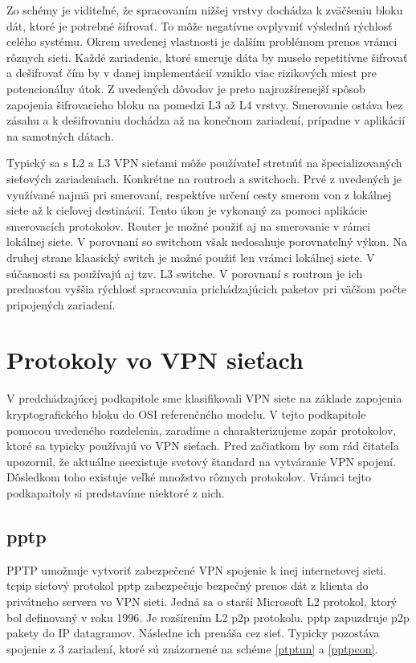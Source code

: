 Zo schémy je viditeľné, že spracovaním nižšej vrstvy dochádza k zväčšeniu bloku dát, ktoré je potrebné šifrovať. To môže negatívne ovplyvniť výslednú rýchlosť celého systému. Okrem uvedenej vlastnosti je dalším problémom prenos vrámci rôznych sieti. Každé zariadenie, ktoré smeruje dáta by muselo repetitívne šifrovať a dešifrovať čím by v danej implementácií vzniklo viac rizikových miest pre potencionálny útok. Z uvedených dôvodov je preto najrozšírenejší spôsob zapojenia šifrovacieho bloku na pomedzi L3 až L4 vrstvy. Smerovanie ostáva bez zásahu a k dešifrovaniu dochádza až na konečnom zariadení, prípadne v aplikácií na samotných dátach.

Typický sa s L2 a L3 VPN sieťami môže používateľ stretnúť na špecializovaných sieťových zariadeniach. Konkrétne na routroch a switchoch. Prvé z uvedených je využívané najmä pri smerovaní, respektíve určení cesty smerom von z lokálnej siete až k cieľovej destinácií. Tento úkon je vykonaný za pomoci aplikácie smerovacích protokolov. Router je možné použiť aj na smerovanie v rámci lokálnej siete. V porovnaní so switchom však nedosahuje porovnateľný výkon. Na druhej strane klaasický switch je možné použiť len vrámci lokálnej siete. V súčasnosti sa používajú aj tzv. L3 switche. V porovnaní s routrom je ich prednosťou vyššia rýchlosť spracovania prichádzajúcich paketov pri väčšom počte pripojených zariadení.        

\section{Protokoly vo VPN sieťach} 
V predchádzajúcej podkapitole sme klasifikovali VPN siete na základe zapojenia kryptografického bloku do OSI referenčného modelu. V tejto podkapitole pomocou uvedeného rozdelenia, zaradíme a charakterizujeme zopár protokolov, ktoré sa typicky používajú vo VPN sieťach. Pred začiatkom by som rád čitateľa upozornil, že aktuálne neexistuje svetový štandard na vytváranie VPN spojení. Dôsledkom toho existuje veľké množstvo rôznych protokolov. Vrámci tejto podkapaitoly si predstavíme niektoré z nich. 

\subsection{\acrfull{pptp}}
PPTP umožnuje vytvoriť zabezpečené VPN spojenie k inej internetovej sieti.
\acrshort{tcpip} sieťový protokol \acrshort{pptp} zabezpečuje bezpečný prenos dát z klienta do privátneho servera vo VPN sieti. Jedná sa o starší Microsoft L2 protokol, ktorý bol definovaný v roku 1996. Je rozšírením L2 \acrshort{p2p} protokolu. \acrshort{pptp} zapuzdruje \acrshort{p2p} pakety do  IP datagramov. Následne ich prenáša cez sieť. Typicky pozostáva spojenie z 3 zariadení, ktoré sú znázornené na schéme \ref{ptptun} a \ref{pptpcon}. 

